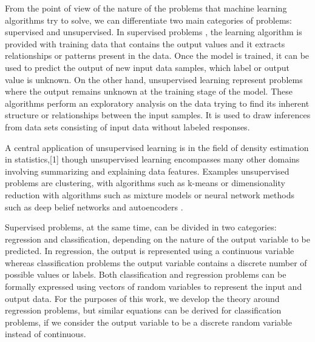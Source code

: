 \bigskip

From the point of view of the nature of the problems that machine learning algorithms try to solve, we can differentiate two main categories of problems: supervised and unsupervised. In supervised problems \citep{russell1995artificial}, the learning algorithm is provided with training data that contains the output values and it extracts relationships or patterns present in the data. Once the model is trained, it can be used to predict the output of new input data samples, which label or output value is unknown. On the other hand, unsupervised learning \citep{hastie2009unsupervised} represent problems where the output remains unknown at the training stage of the model. These algorithms perform an exploratory analysis on the data trying to find its inherent structure or relationships between the input samples. It is used to draw inferences from data sets consisting of input data without labeled responses.

\medskip

A central application of unsupervised learning is in the field of density estimation in statistics,[1] though unsupervised learning encompasses many other domains involving summarizing and explaining data features. Examples unsupervised problems are clustering, with algorithms such as k-means \citep{forgy1965cluster} or dimensionality reduction with algorithms such as mixture models \citep{day1969estimating} or neural network methods such as deep belief networks \citep{hinton2009deep} and autoencoders \citep{hinton2006reducing}.

\medskip

Supervised problems, at the same time, can be divided in two categories: regression and classification, depending on the nature of the output variable to be predicted. In regression, the output is represented using a continuous variable whereas classification problems the output variable contains a discrete number of possible values or labels. Both classification and regression problems can be formally expressed using vectors of random variables to represent the input and output data. For the purposes of this work, we develop the theory around regression problems, but similar equations can be derived for classification problems, if we consider the output variable to be a discrete random variable instead of continuous.

\medskip

